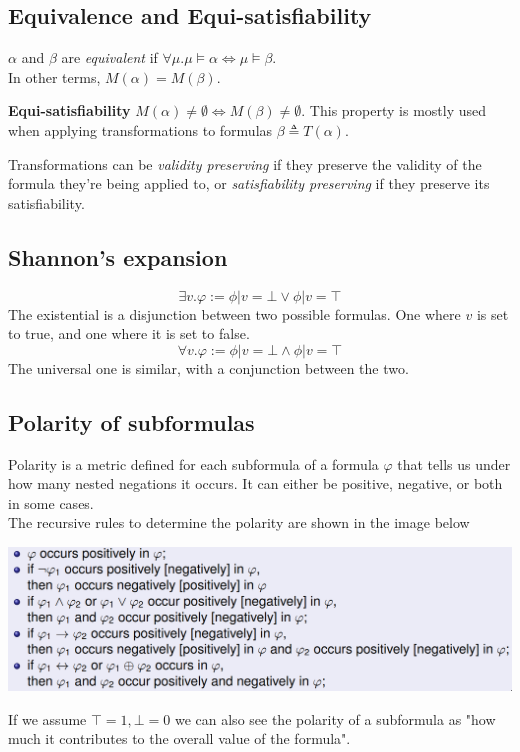 \documentclass{article}
\begin{document}
\subsection*{Equivalence and Equi-satisfiability}
$\alpha$ and $\beta$ are \textit{equivalent} if $\forall \mu.\mu\models\alpha\iff\mu\models\beta$.\\
In other terms, $M(\alpha)=M(\beta)$.

\textbf{Equi-satisfiability} $M(\alpha)\neq\emptyset \iff M(\beta)\neq\emptyset$. This property is mostly used when applying transformations to formulas $\beta\triangleq T(\alpha)$.

Transformations can be \textit{validity preserving} if they preserve the validity of the formula they're being applied to, or \textit{satisfiability preserving} if they preserve its satisfiability.

\subsection*{Shannon's expansion}
$$\exists v.\varphi := \phi|v=\bot \vee \phi|v=\top$$ The existential is a disjunction between two possible formulas. One where $v$ is set to true, and one where it is set to false.
$$\forall v.\varphi := \phi|v=\bot \wedge \phi|v=\top$$ The universal one is similar, with a conjunction between the two.

\subsection*{Polarity of subformulas}
Polarity is a metric defined for each subformula of a formula $\varphi$ that tells us under how many nested negations it occurs. It can either be positive, negative, or both in some cases.\\
The recursive rules to determine the polarity are shown in the image below
\begin{center}
    \includegraphics[width=0.8\linewidth]{images/polarity.png}
\end{center}

If we assume $\top=1,\bot=0$ we can also see the polarity of a subformula as "how much it contributes to the overall value of the formula".
\end{document}
